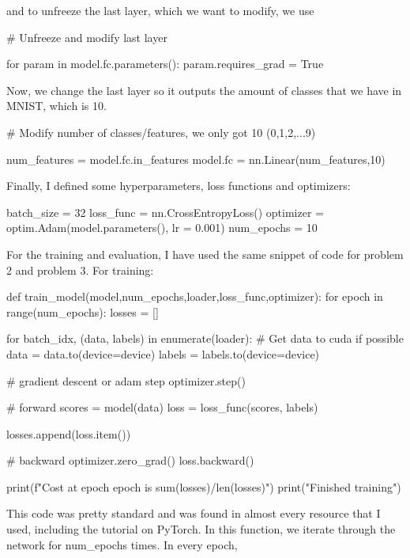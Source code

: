 \documentclass{article}
\numberwithin{equation}{section}
\numberwithin{equation}{section}
\begin{document}
and to unfreeze the last layer, which we want to modify, we use 


\begin{python}
# Unfreeze and modify last layer

for param in model.fc.parameters():
    param.requires_grad = True
    
\end{python}


Now, we change the last layer so it outputs the amount of classes that we have in MNIST, which is 10.

\begin{python}
# Modify number of classes/features, we only got 10 (0,1,2,...9)

num_features = model.fc.in_features
model.fc = nn.Linear(num_features,10)
    
\end{python}

Finally, I defined some hyperparameters, loss functions and optimizers:

\begin{python}
batch_size = 32
loss_func = nn.CrossEntropyLoss()   
optimizer = optim.Adam(model.parameters(), lr = 0.001)   
num_epochs = 10

\end{python}



For the training and evaluation, I have used the same snippet of code for problem 2 and problem 3. For training:

\begin{python}
def train_model(model,num_epochs,loader,loss_func,optimizer):
    for epoch in range(num_epochs):
        losses = []

        for batch_idx, (data, labels) in enumerate(loader):
            # Get data to cuda if possible
            data = data.to(device=device)
            labels = labels.to(device=device)

            # gradient descent or adam step
            optimizer.step()

            # forward
            scores = model(data)
            loss = loss_func(scores, labels)

            losses.append(loss.item())

            # backward
            optimizer.zero_grad()
            loss.backward()  

        print(f"Cost at epoch {epoch} is {sum(losses)/len(losses)}")
    print("Finished training")

\end{python}
This code was pretty standard and was found in almost every resource that I used, including the tutorial on PyTorch. In this function, we iterate through the network for num_epochs times. In every epoch,  
\end{document}
